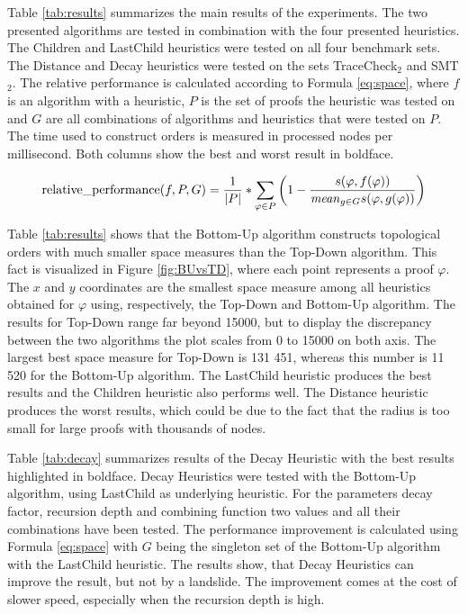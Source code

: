 Table \ref{tab:results} summarizes the main results of the experiments.
The two presented algorithms are tested in combination with the four presented heuristics.
The Children and LastChild heuristics were tested on all four benchmark sets.
The Distance and Decay heuristics were tested on the sets TraceCheck$_2$ and SMT$_2$.
The relative performance is calculated according to Formula \ref{eq:space}, where $f$ is an algorithm with a heuristic, $P$ is the set of proofs the heuristic was tested on and $G$ are all combinations of algorithms and heuristics that were tested on $P$.
The time used to construct orders is measured in processed nodes per millisecond.
Both columns show the best and worst result in boldface.

\begin{align}
  \operatorname{relative\_performance}(f,P,G) = \frac{1}{|P|} * \sum_{\varphi \in P}{\left( 1 -
    \frac{
      s(\varphi,f(\varphi))
    }{
        \mathit{mean}_{g\in G}{s(\varphi,g(\varphi))}
    } \right)
  }
  \label{eq:space}
\end{align}

Table \ref{tab:results} shows that the Bottom-Up algorithm constructs topological orders with much smaller space measures than the Top-Down algorithm. 
This fact is visualized in Figure \ref{fig:BUvsTD}, where each point represents a proof $\varphi$.
The $x$ and $y$ coordinates are the smallest space measure among all heuristics obtained for $\varphi$ using, respectively, the Top-Down and Bottom-Up algorithm.
The results for Top-Down range far beyond 15000, but to display the discrepancy between the two algorithms the plot scales from 0 to 15000 on both axis.
The largest best space measure for Top-Down is 131 451, whereas this number is 11 520 for the Bottom-Up algorithm.
The LastChild heuristic produces the best results and the Children heuristic also performs well.
The Distance heuristic produces the worst results, which could be due to the fact that the radius is too small for large proofs with thousands of  nodes.

Table \ref{tab:decay} summarizes results of the Decay Heuristic with the best results highlighted in boldface.
Decay Heuristics were tested with the Bottom-Up algorithm, using LastChild as underlying heuristic.
For the parameters decay factor, recursion depth and combining function two values and all their combinations have been tested.
The performance improvement is calculated using Formula \ref{eq:space} with $G$ being the singleton set of the Bottom-Up algorithm with the LastChild heuristic.
The results show, that Decay Heuristics can improve the result, but not by a landslide.
The improvement comes at the cost of slower speed, especially when the recursion depth is high.

